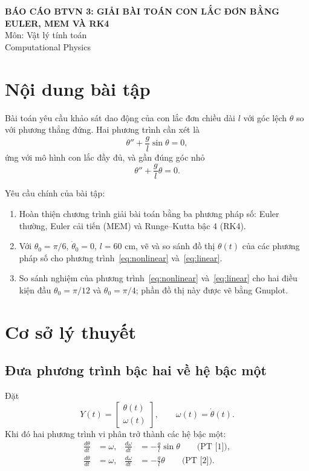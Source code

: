 \documentclass{article}
\begin{document}
\begin{center}
    {\LARGE \textbf{BÁO CÁO BTVN 3: GIẢI BÀI TOÁN CON LẮC ĐƠN BẰNG EULER, MEM VÀ RK4}}\\[0.5em]
    {\large Môn: Vật lý tính toán\\[0.5em]Computational Physics}
\end{center}

\vspace{1em}

\section{Nội dung bài tập}

Bài toán yêu cầu khảo sát dao động của con lắc đơn chiều dài $l$ với góc lệch $\theta$ so với phương thẳng đứng. Hai phương trình cần xét là
\begin{equation}
\theta'' + \frac{g}{l}\sin\theta = 0,
\label{eq:nonlinear}
\end{equation}
ứng với mô hình con lắc đầy đủ, và gần đúng góc nhỏ
\begin{equation}
\theta'' + \frac{g}{l}\theta = 0.
\label{eq:linear}
\end{equation}

Yêu cầu chính của bài tập:
\begin{enumerate}
    \item Hoàn thiện chương trình giải bài toán bằng ba phương pháp số: Euler thường, Euler cải tiến (MEM) và Runge--Kutta bậc 4 (RK4).
    \item Với $\theta_0 = \pi/6$, $\dot\theta_0 = 0$, $l = 60$ cm, vẽ và so sánh đồ thị $\theta(t)$ của các phương pháp số cho phương trình~\eqref{eq:nonlinear} và~\eqref{eq:linear}.
    \item So sánh nghiệm của phương trình~\eqref{eq:nonlinear} và~\eqref{eq:linear} cho hai điều kiện đầu $\theta_0 = \pi/12$ và $\theta_0 = \pi/4$; phần đồ thị này được vẽ bằng Gnuplot.
\end{enumerate}

\section{Cơ sở lý thuyết}

\subsection{Đưa phương trình bậc hai về hệ bậc một}

Đặt
\[
Y(t) = 
\begin{bmatrix}
\theta(t)\\
\omega(t)
\end{bmatrix},
\qquad \omega(t)=\dot\theta(t).
\]
Khi đó hai phương trình vi phân trở thành các hệ bậc một:
\begin{align}
\frac{d\theta}{dt} &= \omega,
&
\frac{d\omega}{dt} &= -\frac{g}{l}\sin\theta
\qquad \text{(PT [1])},
\label{eq:sys1}
\\
\frac{d\theta}{dt} &= \omega,
&
\frac{d\omega}{dt} &= -\frac{g}{l}\theta
\qquad \text{(PT [2])}.
\label{eq:sys2}
\end{align}
\end{document}
